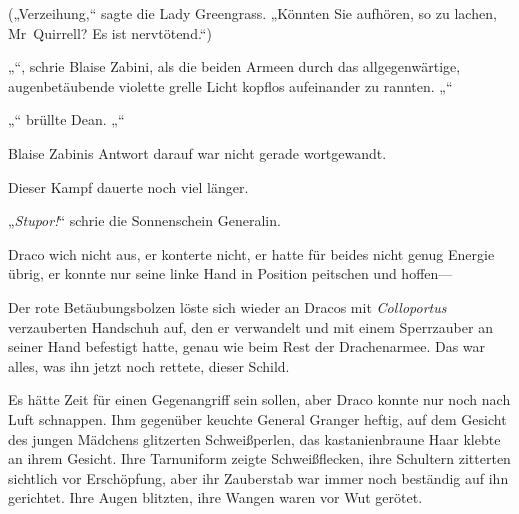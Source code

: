 („Verzeihung,“ sagte die Lady Greengrass. „Könnten Sie aufhören, so zu lachen, Mr~Quirrell? Es ist nervtötend.“)

„“, schrie Blaise Zabini, als die beiden Armeen durch das allgegenwärtige, augenbetäubende violette grelle Licht kopflos aufeinander zu rannten. „“

„“ brüllte Dean. „“

Blaise Zabinis Antwort darauf war nicht gerade wortgewandt.

Dieser Kampf dauerte noch viel länger.

\later

„\emph{Stupor!}“ schrie die Sonnenschein Generalin.

Draco wich nicht aus, er konterte nicht, er hatte für beides nicht genug Energie übrig, er konnte nur seine linke Hand in Position peitschen und hoffen—

Der rote Betäubungsbolzen löste sich wieder an Dracos mit \emph{Colloportus} verzauberten Handschuh auf, den er verwandelt und mit einem Sperrzauber an seiner Hand befestigt hatte, genau wie beim Rest der Drachenarmee. Das war alles, was ihn jetzt noch rettete, dieser Schild.

Es hätte Zeit für einen Gegenangriff sein sollen, aber Draco konnte nur noch nach Luft schnappen. Ihm gegenüber keuchte General Granger heftig, auf dem Gesicht des jungen Mädchens glitzerten Schweißperlen, das kastanienbraune Haar klebte an ihrem Gesicht. Ihre Tarnuniform zeigte Schweißflecken, ihre Schultern zitterten sichtlich vor Erschöpfung, aber ihr Zauberstab war immer noch beständig auf ihn gerichtet. Ihre Augen blitzten, ihre Wangen waren vor Wut gerötet.

